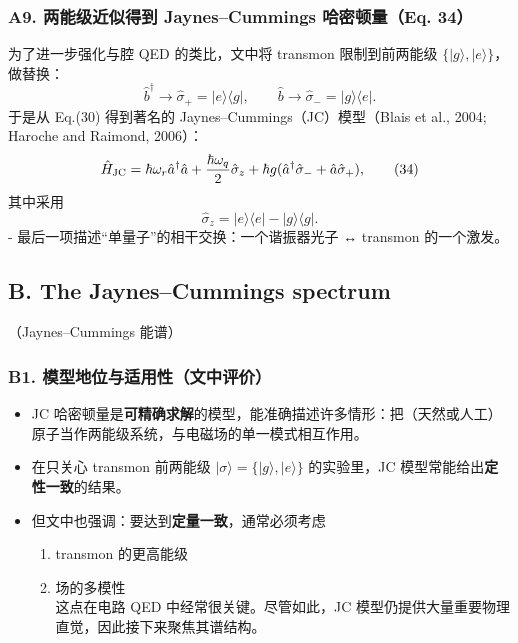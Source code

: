 \documentclass[12pt,a4paper,oneside]{ctexbook}
\providecommand{\tightlist}{%
  \setlength{\itemsep}{0pt}\setlength{\parskip}{0pt}}
\begin{document}
\subsubsection{\texorpdfstring{\textbf{A9. 两能级近似得到 Jaynes--Cummings
哈密顿量（Eq.
34）}}{A9. 两能级近似得到 Jaynes--Cummings 哈密顿量（Eq. 34）}}\label{a9.-ux4e24ux80fdux7ea7ux8fd1ux4f3cux5f97ux5230-jaynescummings-ux54c8ux5bc6ux987fux91cfeq.-34}

为了进一步强化与腔 QED 的类比，文中将 transmon 限制到前两能级
\(\{|g\rangle,|e\rangle\}\)，做替换： \[
\hat b^\dagger\rightarrow \hat\sigma_+ = |e\rangle\langle g|,\qquad
\hat b\rightarrow \hat\sigma_- = |g\rangle\langle e|.
\] 于是从 Eq.(30) 得到著名的 Jaynes--Cummings（JC）模型（Blais et al.,
2004; Haroche and Raimond, 2006）： \[
\hat H_{\rm JC}
=\hbar\omega_r\hat a^\dagger\hat a
+\frac{\hbar\omega_q}{2}\hat\sigma_z
+\hbar g(\hat a^\dagger\hat\sigma_-+\hat a\hat\sigma_+),
\tag{34}
\] 其中采用 \[
\hat\sigma_z=|e\rangle\langle e|-|g\rangle\langle g|.
\] - 最后一项描述``单量子''的相干交换：一个谐振器光子 ↔ transmon
的一个激发。


\subsection{\texorpdfstring{\textbf{B. The Jaynes--Cummings
spectrum}}{B. The Jaynes--Cummings spectrum}}\label{b.-the-jaynescummings-spectrum}

（Jaynes--Cummings 能谱）

\subsubsection{\texorpdfstring{\textbf{B1.
模型地位与适用性（文中评价）}}{B1. 模型地位与适用性（文中评价）}}\label{b1.-ux6a21ux578bux5730ux4f4dux4e0eux9002ux7528ux6027ux6587ux4e2dux8bc4ux4ef7}

\begin{itemize}
\tightlist
\item
  JC
  哈密顿量是\textbf{可精确求解}的模型，能准确描述许多情形：把（天然或人工）原子当作两能级系统，与电磁场的单一模式相互作用。
\item
  在只关心 transmon 前两能级 \(|\sigma\rangle=\{|g\rangle,|e\rangle\}\)
  的实验里，JC 模型常能给出\textbf{定性一致}的结果。
\item
  但文中也强调：要达到\textbf{定量一致}，通常必须考虑

  \begin{enumerate}
  \def\labelenumi{\arabic{enumi})}
  \tightlist
  \item
    transmon 的更高能级\\
  \item
    场的多模性\\
    这点在电路 QED 中经常很关键。尽管如此，JC
    模型仍提供大量重要物理直觉，因此接下来聚焦其谱结构。
  \end{enumerate}
\end{itemize}
\end{document}
